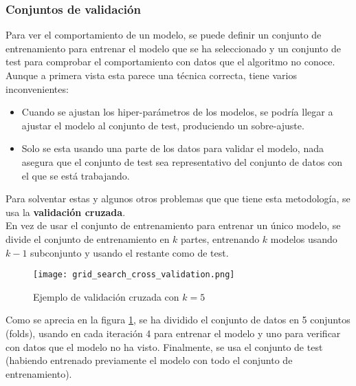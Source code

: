 \subsubsection{Conjuntos de validación}
Para ver el comportamiento de un modelo, se puede definir un conjunto de entrenamiento para entrenar el modelo que se ha seleccionado y un conjunto de test para comprobar el comportamiento con datos que el algoritmo no conoce.  Aunque a primera vista esta parece una técnica correcta, tiene varios inconvenientes:
\begin{itemize}
	\item Cuando se ajustan los hiper-parámetros de los modelos,  se podría llegar a ajustar el modelo al conjunto de test, produciendo un sobre-ajuste.
	\item Solo se esta usando una parte de los datos para validar el modelo, nada asegura que el conjunto de test sea representativo del conjunto de datos con el que se está trabajando.
\end{itemize}
Para solventar estas y algunos otros problemas que que tiene esta metodología, se usa la \textbf{validación cruzada}.\\
\linebreak
En vez de usar el conjunto de entrenamiento para entrenar un único modelo, se divide el conjunto de entrenamiento en $k$ partes, entrenando $k$ modelos usando $k-1$ subconjunto y usando el restante como de test. \\
 \begin{figure}[H]
	\centering
	\texttt{[image: grid\_search\_cross\_validation.png]}
	\caption{Ejemplo de validación cruzada con $k=5$}
	\label{fig:cross-validation}
\end{figure}
Como se aprecia en la figura \ref{fig:cross-validation},  se ha dividido el conjunto de datos en 5 conjuntos (folds), usando en cada iteración 4 para entrenar el modelo y uno para verificar con datos que el modelo no ha visto. Finalmente, se usa el conjunto de test (habiendo entrenado previamente el modelo con todo el conjunto de entrenamiento).
